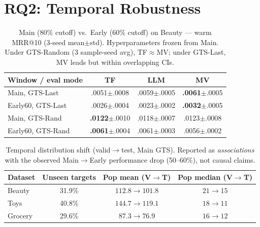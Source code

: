 \documentclass[sigconf,natbib=true,anonymous]{acmart}
\begin{document}
\section{RQ2: Temporal Robustness}
\label{sec:rq2}

\begin{table}[t]
\centering
\caption{%
Main ($80\%$ cutoff) vs.\ Early ($60\%$ cutoff) on Beauty --- warm MRR@10 (3-seed mean$\pm$std).
Hyperparameters frozen from Main.
Under GTS-Random (3 sample-seed avg), TF$\approx$MV; under GTS-Last, MV leads but within overlapping CIs.%
}
\label{tab:early}
\small
\begin{tabular}{@{}lccc@{}}
\toprule
Window / eval mode & TF & LLM & MV \\
\midrule
Main, GTS-Last    & .0051\tiny{$\pm$.0008} & .0059\tiny{$\pm$.0005} & \textbf{.0061}\tiny{$\pm$.0005} \\
Early60, GTS-Last & .0026\tiny{$\pm$.0004} & .0023\tiny{$\pm$.0002} & \textbf{.0032}\tiny{$\pm$.0005} \\
\midrule
Main, GTS-Rand    & \textbf{.0122}\tiny{$\pm$.0010} & .0118\tiny{$\pm$.0007} & .0123\tiny{$\pm$.0008} \\
Early60, GTS-Rand & \textbf{.0061}\tiny{$\pm$.0004} & .0061\tiny{$\pm$.0003} & .0056\tiny{$\pm$.0002} \\
\bottomrule
\end{tabular}
\end{table}

\begin{table}[t]
\centering
\caption{%
Temporal distribution shift (valid$\to$test, Main GTS).
Reported as \emph{associations} with the observed Main$\to$Early performance drop (50--60\%), not causal claims.%
}
\label{tab:shift}
\small
\setlength{\tabcolsep}{4pt}
\begin{tabular}{@{}lccc@{}}
\toprule
Dataset & Unseen targets & Pop mean (V$\to$T) & Pop median (V$\to$T) \\
\midrule
Beauty  & 31.9\% & $112.8 \to 101.8$ & $21 \to 15$ \\
Toys    & 40.8\% & $144.7 \to 119.1$ & $18 \to 11$ \\
Grocery & 29.6\% & $87.3 \to 76.9$ & $16 \to 12$ \\
\bottomrule
\end{tabular}
\end{table}
\end{document}
